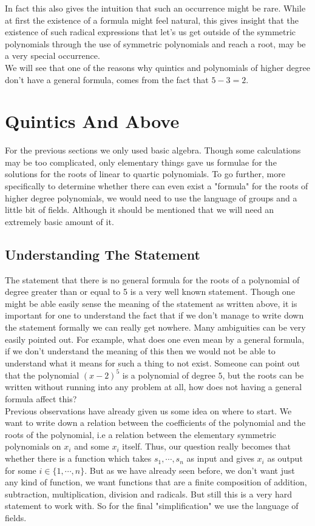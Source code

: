 \documentclass[a4paper,12pt,abstracton]{scrartcl}
\theoremstyle{dotlessP}
\theoremstyle{dotlessS}
\theoremstyle{remark}
\theoremstyle{definition}
\begin{document}
In fact this also gives the intuition that such an occurrence might be rare. While at first the existence of a formula might feel natural, this gives insight that the existence of such radical expressions that let's us get outside of the symmetric polynomials through the use of symmetric polynomials and reach a root, may be a very special occurrence.\\

We will see that one of the reasons why quintics and polynomials of higher degree don't have a general formula, comes from the fact that $5-3=2$. 

\eject

\section{Quintics And Above}

For the previous sections we only used basic algebra. Though some calculations may be too complicated, only elementary things gave us formulae for the solutions for the roots of linear to quartic polynomials. To go further, more specifically to determine whether there can even exist a "formula" for the roots of higher degree polynomials, we would need to use the language of groups and a little bit of fields. Although it should be mentioned that we will need an extremely basic amount of it. 

\subsection{Understanding The Statement}


The statement that there is no general formula for the roots of a polynomial of degree greater than or equal to 5 is a very well known statement. Though one might be able easily sense the meaning of the statement as written above, it is important for one to understand the fact that if we don't manage to write down the statement formally we can really get nowhere. Many ambiguities can be very easily pointed out. For example, what does one even mean by a general formula, if we don't understand the meaning of this then we would not be able to understand what it means for such a thing to not exist. Someone can point out that the polynomial $(x-2)^5$ is a polynomial of degree $5$, but the roots can be written without running into any problem at all, how does not having a general formula affect this?\\

Previous observations have already given us some idea on where to start. We want to write down a relation between the coefficients of the polynomial and the roots of the polynomial, i.e a relation between the elementary symmetric polynomials on $x_i$ and some $x_i$ itself. Thus, our question really becomes that whether there is a function which takes $s_1,\cdots,s_n$ as input and gives $x_i$ as output for some $i\in\{1,\cdots,n\}$. But as we have already seen before, we don't want just any kind of function, we want functions that are a finite composition of addition, subtraction,  multiplication, division and radicals. But still this is a very hard statement to work with. So for the final "simplification" we use the language of fields.\\
\end{document}
